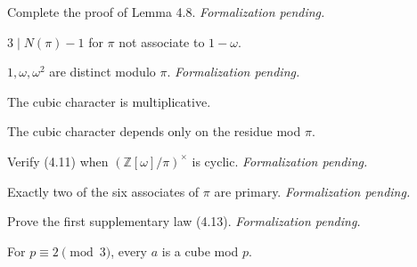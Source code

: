 \begin{theorem}[Exercise 4.8]
  \label{exr:s4_8}
  \notready
  Complete the proof of Lemma 4.8. \emph{Formalization pending.}
\end{theorem}

\begin{theorem}[Exercise 4.9(a)]
  \label{exr:s4_9_a}
  \leanok
  $3 \mid N(\pi) - 1$ for $\pi$ not associate to $1-\omega$.
\end{theorem}

\begin{theorem}[Exercise 4.9(b)]
  \label{exr:s4_9_b}
  \notready
  $1,\omega,\omega^2$ are distinct modulo $\pi$. \emph{Formalization pending.}
\end{theorem}

\begin{theorem}[Exercise 4.10(a)]
  \label{exr:s4_10_a}
  \leanok
  The cubic character is multiplicative.
\end{theorem}

\begin{theorem}[Exercise 4.10(b)]
  \label{exr:s4_10_b}
  \leanok
  The cubic character depends only on the residue mod $\pi$.
\end{theorem}

\begin{theorem}[Exercise 4.11]
  \label{exr:s4_11}
  \notready
  Verify (4.11) when $(\mathbb Z[\omega]/\pi)^\times$ is cyclic. \emph{Formalization pending.}
\end{theorem}

\begin{theorem}[Exercise 4.12]
  \label{exr:s4_12}
  \notready
  Exactly two of the six associates of $\pi$ are primary. \emph{Formalization pending.}
\end{theorem}

\begin{theorem}[Exercise 4.13]
  \label{exr:s4_13}
  \notready
  Prove the first supplementary law (4.13). \emph{Formalization pending.}
\end{theorem}

\begin{theorem}[Exercise 4.14]
  \label{exr:s4_14}
  \leanok
  For $p \equiv 2 \pmod 3$, every $a$ is a cube mod $p$.
\end{theorem}


